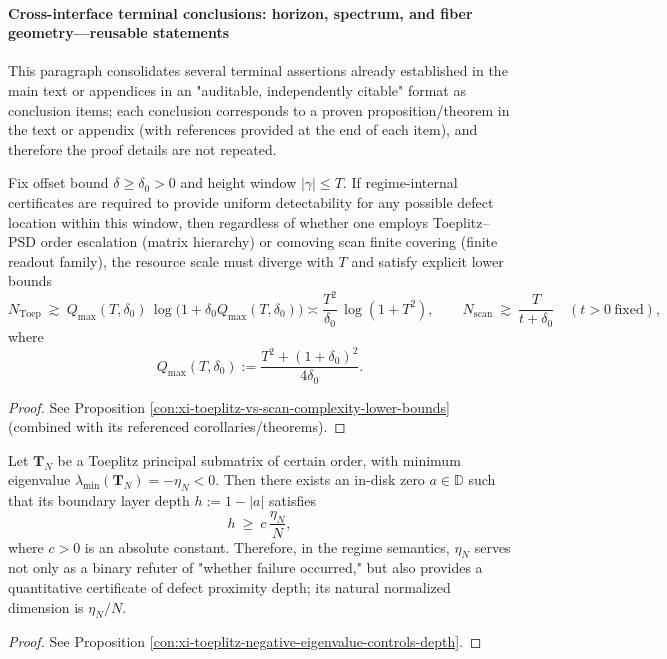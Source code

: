 \paragraph{Cross-interface terminal conclusions: horizon, spectrum, and fiber geometry—reusable statements}
This paragraph consolidates several terminal assertions already established in the main text or appendices in an "auditable, independently citable" format as conclusion items; each conclusion corresponds to a proven proposition/theorem in the text or appendix (with references provided at the end of each item), and therefore the proof details are not repeated.

\begin{conclusion}\label{con:xi-terminal-horizon-certificate-quadratic-linear-lb}
Fix offset bound \(\delta\ge \delta_0>0\) and height window \(|\gamma|\le T\).
If regime-internal certificates are required to provide uniform detectability for any possible defect location within this window, then regardless of whether one employs Toeplitz--PSD order escalation (matrix hierarchy) or comoving scan finite covering (finite readout family), the resource scale must diverge with \(T\) and satisfy explicit lower bounds
\[
N_{\mathrm{Toep}}\ \gtrsim\ Q_{\max}(T,\delta_0)\,\log\!\bigl(1+\delta_0 Q_{\max}(T,\delta_0)\bigr)
\asymp \frac{T^2}{\delta_0}\,\log(1+T^2),
\qquad
N_{\mathrm{scan}}\ \gtrsim\ \frac{T}{t+\delta_0}\quad(t>0\ \text{fixed}),
\]
where
\[
Q_{\max}(T,\delta_0):=\frac{T^2+(1+\delta_0)^2}{4\delta_0}.
\]
\end{conclusion}
\begin{proof}[Proof]
See Proposition \ref{con:xi-toeplitz-vs-scan-complexity-lower-bounds} (combined with its referenced corollaries/theorems).
\end{proof}

\begin{conclusion}\label{con:xi-terminal-negative-spectrum-boundary-layer-depth}
Let \(\mathbf{T}_N\) be a Toeplitz principal submatrix of certain order, with minimum eigenvalue \(\lambda_{\min}(\mathbf{T}_N)=-\eta_N<0\).
Then there exists an in-disk zero \(a\in\mathbb D\) such that its boundary layer depth \(h:=1-|a|\) satisfies
\[
h\ \ge\ c\,\frac{\eta_N}{N},
\]
where \(c>0\) is an absolute constant.
Therefore, in the regime semantics, \(\eta_N\) serves not only as a binary refuter of "whether failure occurred," but also provides a quantitative certificate of defect proximity depth; its natural normalized dimension is \(\eta_N/N\).
\end{conclusion}
\begin{proof}[Proof]
See Proposition \ref{con:xi-toeplitz-negative-eigenvalue-controls-depth}.
\end{proof}

